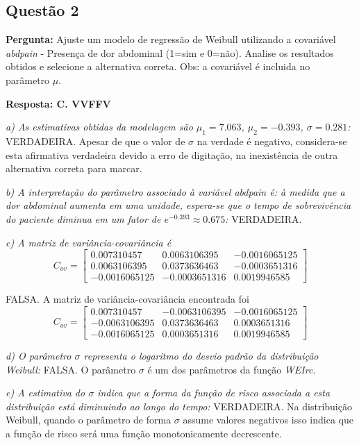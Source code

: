 \documentclass[a4paper,12pt]{article}
\begin{document}
\subsection{Questão 2}
\textbf{Pergunta:} Ajuste um modelo de regressão de Weibull utilizando a covariável \textit{abdpain} - Presença de dor abdominal (1=sim e 0=não). Analise os resultados obtidos e selecione a alternativa correta. Obs: a covariável é incluida no parâmetro $\mu$.

\textbf{Resposta: C. VVFFV
} 

\textit{a) As estimativas obtidas da modelagem são $\mu_1 =  7.063$, $\mu_2 =-0.393$, $\sigma = 0.281$:} VERDADEIRA. Apesar de que o valor de $\sigma$ na verdade é negativo, considera-se esta afirmativa verdadeira devido a erro de digitação, na inexistência de outra alternativa correta para marcar.

\textit{b) A interpretação do parâmetro associado à variável abdpain é: à medida que a dor abdominal aumenta em uma unidade, espera-se que o tempo de sobrevivência do paciente diminua em um fator de $e^{-0.393} \approx 0.675$:} VERDADEIRA.


\textit{c) A matriz de variância-covariância é
\begin{equation}
C_{ov} = \begin{bmatrix}
0.007310457 & 0.0063106395 & -0.0016065125 \\
0.0063106395 & 0.0373636463 & -0.0003651316 \\
-0.0016065125 & -0.0003651316 & 0.0019946585
\end{bmatrix}
\end{equation}}

FALSA. A matriz de variância-covariância encontrada foi
\begin{equation}
C_{ov} = \begin{bmatrix}
0.007310457 & -0.0063106395 & -0.0016065125 \\
-0.0063106395 & 0.0373636463 & 0.0003651316 \\
-0.0016065125 & 0.0003651316 & 0.0019946585
\end{bmatrix}
\end{equation}


\textit{d) O parâmetro $\sigma$ representa o logaritmo do desvio padrão da distribuição Weibull:} FALSA. O parâmetro $\sigma$ é um dos parâmetros da função \textit{WEIrc}.


\textit{e) A estimativa do $\sigma$  indica que a forma da função de risco associada a esta distribuição está diminuindo ao longo do tempo:} VERDADEIRA. Na distribuição Weibull, quando o parâmetro de forma $\sigma$ assume valores negativos isso indica que a função de risco será uma função monotonicamente decrescente.
\end{document}
